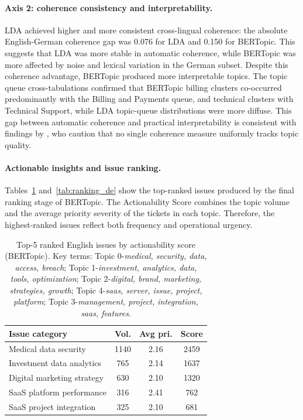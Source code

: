 \documentclass[11pt]{article}
\begin{document}
\paragraph{Axis 2: coherence consistency and interpretability.}
LDA achieved higher and more consistent cross-lingual coherence: the absolute English-German coherence gap was 0.076 for LDA and 0.150 for BERTopic. This suggests that LDA was more stable in automatic coherence, while BERTopic was more affected by noise and lexical variation in the German subset. Despite this coherence advantage, BERTopic produced more interpretable topics. The topic queue cross-tabulations confirmed that BERTopic billing clusters co-occurred predominantly with the Billing and Payments queue, and technical clusters with Technical Support, while LDA topic-queue distributions were more diffuse. This gap between automatic coherence and practical interpretability is consistent with findings by \citet{roder2015exploring}, who caution that no single coherence measure uniformly tracks topic quality.
 
\paragraph{Actionable insights and issue ranking.}
Tables~\ref{tab:ranking_en} and~\ref{tab:ranking_de} show the top-ranked issues produced by the final ranking stage of BERTopic. The Actionability Score combines the topic volume and the average priority severity of the tickets in each topic. Therefore, the highest-ranked issues reflect both frequency and operational urgency.
 
\begin{table}[H]
\centering
\small
\begin{tabular}{p{3.6cm}ccc}
\toprule
\textbf{Issue category} & \textbf{Vol.} & \textbf{Avg pri.} & \textbf{Score} \\
\midrule
Medical data security      & 1140 & 2.16 & 2459 \\
Investment data analytics  & 765  & 2.14 & 1637 \\
Digital marketing strategy & 630  & 2.10 & 1320 \\
SaaS platform performance  & 316  & 2.41 & 762  \\
SaaS project integration   & 325  & 2.10 & 681  \\
\bottomrule
\end{tabular}
\caption{Top-5 ranked English issues by actionability score (BERTopic). Key terms: Topic 0-\textit{medical, security, data, access, breach}; Topic 1-\textit{investment, analytics, data, tools, optimization}; Topic 2-\textit{digital, brand, marketing, strategies, growth}; Topic 4-\textit{saas, server, issue, project, platform}; Topic 3-\textit{management, project, integration, saas, features}.}
\label{tab:ranking_en}
\end{table}
 
\end{document}
